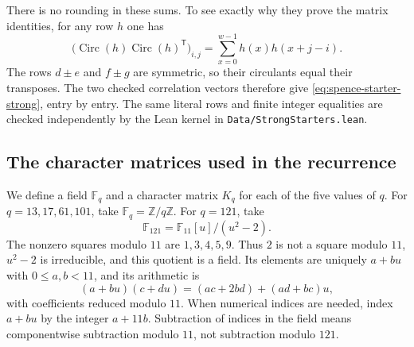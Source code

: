 \documentclass[10pt]{article}
\begin{document}
There is no rounding in these sums. To see exactly why they prove the
matrix identities, for any row $h$ one has
\[
 \bigl(\operatorname{Circ}(h)\operatorname{Circ}(h)^{\mathsf T}\bigr)_{i,j}
 =\sum_{x=0}^{w-1}h(x)h(x+j-i).
\]
The rows $d\pm e$ and $f\pm g$ are symmetric, so their circulants equal
their transposes. The two checked correlation vectors therefore give
\eqref{eq:spence-starter-strong}, entry by entry. The same literal rows
and finite integer equalities are checked independently by the Lean kernel
in \texttt{Data/StrongStarters.lean}.

\subsection{The character matrices used in the recurrence}

We define a field $\mathbb F_q$ and a character matrix $K_q$ for each
of the five values of $q$. For $q=13,17,61,101$, take
$\mathbb F_q=\mathbb Z/q\mathbb Z$. For $q=121$, take
\[
 \mathbb F_{121}=\mathbb F_{11}[u]/(u^2-2).
\]
The nonzero squares modulo $11$ are $1,3,4,5,9$. Thus $2$ is not a
square modulo $11$, $u^2-2$ is irreducible, and this quotient is a field.
Its elements are uniquely $a+bu$ with $0\leq a,b<11$, and its arithmetic is
\[
 (a+bu)(c+du)=(ac+2bd)+(ad+bc)u,
\]
with coefficients reduced modulo $11$. When numerical indices are needed,
index $a+bu$ by the integer $a+11b$. Subtraction of indices in the field
means componentwise subtraction modulo $11$, not subtraction modulo $121$.
\end{document}
